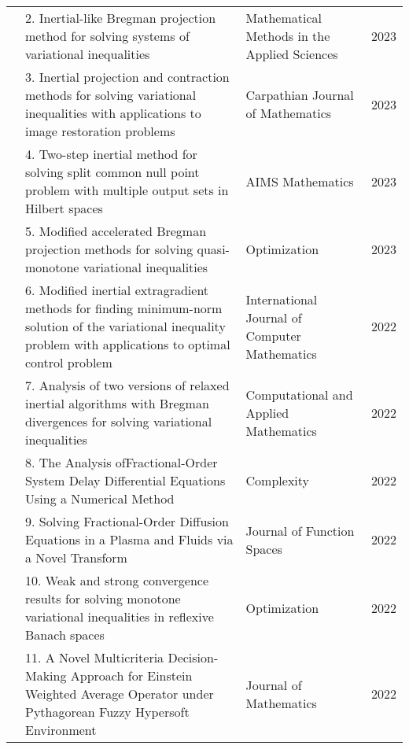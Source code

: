 {\begin{center}
\begin{longtable}{|p{}|p{}|p{}|p{}|}
&2. Inertial-like Bregman\newline 
projection method for 
solving systems of 
variational inequalities
&Mathematical Methods in the Applied Sciences
& 2023 \\ \cline{2-4}		

&3. Inertial projection and \newline  
contraction methods for 
solving variational
inequalities with
applications to image   
restoration problems							
&
Carpathian Journal 
of Mathematics&
2023 
\\ \cline{2-4}

&4. Two-step inertial method
for solving split common
null point problem with
multiple output sets in
Hilbert spaces
&AIMS Mathematics&
2023 \\ \cline{2-4}	

&5. Modified accelerated \newline   
Bregman projection 
methods for solving quasi- 
monotone variational  
inequalities
&Optimization &
2023 \\ \cline{2-4}	

&6. Modified inertial 
extragradient methods for 
finding minimum-norm solution
of the variational inequality
problem with applications to
optimal control problem
&International 
Journal of Computer 
Mathematics&
2022 \\ \cline{2-4}

&7. Analysis of two \newline versions of
relaxed inertial algorithms
with Bregman divergences 
for solving variational 
inequalities
&Computational and 
Applied Mathematics
&2022\\\cline{2-4}	

&8. The Analysis of\newline  Fractional-Order System Delay 
Differential Equations
Using a Numerical Method					
&Complexity
&2022\\ \cline{2-4}	

&9.	Solving Fractional-Order 
Diffusion Equations in a 
Plasma and Fluids via a
Novel Transform 
&Journal of
Function Spaces
&2022 \\ \cline{2-4}

&10. Weak and strong \newline
convergence results for
solving monotone variational
inequalities in reflexive
Banach spaces
&Optimization
&2022 
\\ \cline{2-4}

&11. A Novel Multicriteria \newline
Decision-Making 
Approach for Einstein 
Weighted Average
Operator under
Pythagorean Fuzzy
Hypersoft Environment
&Journal of Mathematics
&2022 \\ \cline{2-4}		


\end{longtable}
\end{center}}
